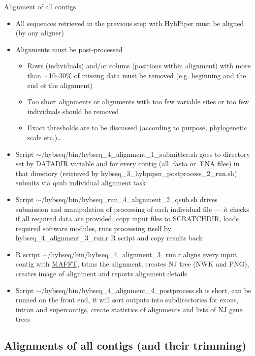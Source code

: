 \documentclass[compress,  xelatex, 11pt, xcolor=x11names, aspectratio=169,
	hyperref={
		bookmarks=true,
		unicode=true,
		colorlinks=true,
		pdftitle={HybSeq course},
		plainpages=false,
		pdfauthor={Vojtech Zeisek},
		pdfsubject={Practical processing of HybSeq target enrichment sequencing data on computing grids like MetaCentrum},
		pdfcreator={XeLaTeX},
		pdfkeywords={BASH, command line, GNU, HybSeq, Linux, MetaCentrum, sequencing shell, target enrichment},
		linkcolor=Turquoise4, %
		anchorcolor=DodgerBlue4, %
		citecolor=DodgerBlue4, %
		filecolor=DodgerBlue4, %
		menucolor=Tan4, %
		urlcolor=DarkOliveGreen4 %
		},
	url={hyphens, lowtilde} %
	]{beamer}
\renewcommand{\texttt}[1]{\colorbox{Cornsilk2}{{\ttfamily #1}}}
\begin{document}
\begin{frame}[allowframebreaks]{Alignment of all contigs}
	\begin{itemize}
		\item All sequences retrieved in the previous step with HybPiper must be aligned (by any aligner)
		\item Alignments must be post-processed
		\begin{itemize}
			\item Rows (individuals) and/or colums (positions within alignment) with more than $\sim$10--30\% of missing data must be removed (e.g. beginning and the end of the alignment)
			\item Too short alignments or alignments with too few variable sites or too few individuals should be removed
			\item Exact thresholds are to be discussed (according to purpose, phylogenetic scale etc.)\ldots
		\end{itemize}
		\item Script \texttt{$\sim$/hybseq/bin/hybseq\_4\_alignment\_1\_submitter.sh} goes to directory set by \texttt{DATADIR} variable and for every contig (all \texttt{*.fasta} or \texttt{*.FNA} files) in that directory (retrieved by \texttt{hybseq\_3\_hybpiper\_postprocess\_2\_run.sh}) submits via \texttt{qsub} individual alignment task
		\item Script \texttt{$\sim$/hybseq/bin/hybseq\_run\_4\_alignment\_2\_qsub.sh} drives submission and manipulation of processing of each individual file --- it checks if all required data are provided, copy input files to \texttt{SCRATCHDIR}, loads required software modules, runs processing itself by \texttt{hybseq\_4\_alignment\_3\_run.r} \texttt{R} script and copy results back
		\item \texttt{R} script \texttt{$\sim$/hybseq/bin/hybseq\_4\_alignment\_3\_run.r} aligns every input contig with \href{https://mafft.cbrc.jp/alignment/software/}{MAFFT}, trims the alignment, creates NJ tree (NWK and PNG), creates image of alignment and reports alignment details
		\item Script \texttt{$\sim$/hybseq/bin/hybseq\_4\_alignment\_4\_postprocess.sh} is short, can be runned on the front end, it will sort outputs into subdirectories for exons, intron and supercontigs, create statistics of alignments and lists of NJ gene trees
	\end{itemize}
\end{frame}

\subsection{Alignments of all contigs (and their trimming)}
\end{document}
